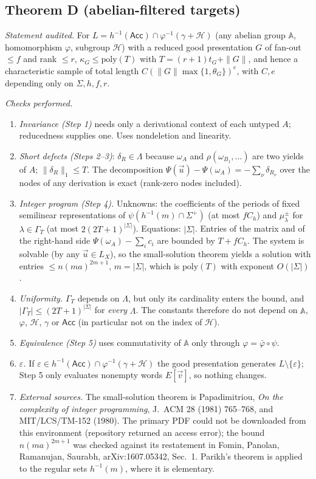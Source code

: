 \documentclass[11pt]{article}
\theoremstyle{definition}
\theoremstyle{remark}
\newcommand{\tuple}[1]{\vec{#1}}
\begin{document}
\subsection{Theorem D (abelian-filtered targets)}
\emph{Statement audited.}  For
$L=h^{-1}(\mathsf{Acc})\cap\varphi^{-1}(\gamma+\mathcal H)$ (any abelian
group $\mathbb A$, homomorphism $\varphi$, subgroup $\mathcal H$) with a
reduced good presentation $G$ of fan-out $\le f$ and rank $\le r$,
$\kappa_G\le\mathrm{poly}(T)$ with $T=(r+1)t_G+\|G\|$, and hence a
characteristic sample of total length $C(\|G\|\max\{1,\theta_G\})^e$, with
$C,e$ depending only on $\Sigma,h,f,r$.

\emph{Checks performed.}
\begin{enumerate}[label=(D\arabic*)]
\item \emph{Invariance (Step 1)} needs only a derivational context of each
untyped $A$; reducedness supplies one.  Uses nondeletion and linearity.
\item \emph{Short defects (Steps 2--3)}: $\delta_R\in\Lambda$ because
$\omega_A$ and $\rho(\omega_{B_1},\ldots)$ are two yields of $A$;
$\|\delta_R\|_1\le T$.  The decomposition
$\Psi(\tuple u)-\Psi(\omega_A)=-\sum_\nu\delta_{R_\nu}$ over the nodes of
any derivation is exact (rank-zero nodes included).
\item \emph{Integer program (Step 4).}  Unknowns: the coefficients of the
periods of fixed semilinear representations of
$\psi(h^{-1}(m)\cap\Sigma^+)$ (at most $fC_h$) and
$\mu^\pm_\lambda$ for $\lambda\in\Gamma_T$ (at most $2(2T+1)^{|\Sigma|}$).
Equations: $|\Sigma|$.  Entries of the matrix and of the right-hand side
$\Psi(\omega_A)-\sum_ic_i$ are bounded by $T+fC_h$.  The system is solvable
(by any $\tuple u\in L_X$), so the small-solution theorem yields a solution
with entries $\le n(ma)^{2m+1}$, $m=|\Sigma|$, which is $\mathrm{poly}(T)$
with exponent $O(|\Sigma|)$.
\item \emph{Uniformity.}  $\Gamma_T$ depends on $\Lambda$, but only its
cardinality enters the bound, and $|\Gamma_T|\le(2T+1)^{|\Sigma|}$ for
\emph{every} $\Lambda$.  The constants therefore do not depend on
$\mathbb A$, $\varphi$, $\mathcal H$, $\gamma$ or $\mathsf{Acc}$ (in
particular not on the index of $\mathcal H$).
\item \emph{Equivalence (Step 5)} uses commutativity of $\mathbb A$ only
through $\varphi=\bar\varphi\circ\psi$.
\item \emph{$\varepsilon$.}  If $\varepsilon\in h^{-1}(\mathsf{Acc})\cap
\varphi^{-1}(\gamma+\mathcal H)$ the good presentation generates
$L\setminus\{\varepsilon\}$; Step 5 only evaluates nonempty words
$E[\tuple v]$, so nothing changes.
\item \emph{External sources.}  The small-solution theorem is
Papadimitriou, \emph{On the complexity of integer programming},
J.~ACM 28 (1981) 765--768, and MIT/LCS/TM-152 (1980).  The primary PDF
could not be downloaded from this environment (repository returned an
access error); the bound $n(ma)^{2m+1}$ was checked against its restatement
in Fomin, Panolan, Ramanujan, Saurabh, arXiv:1607.05342, Sec.~1.  Parikh's
theorem is applied to the regular sets $h^{-1}(m)$, where it is elementary.
\end{enumerate}
\end{document}
